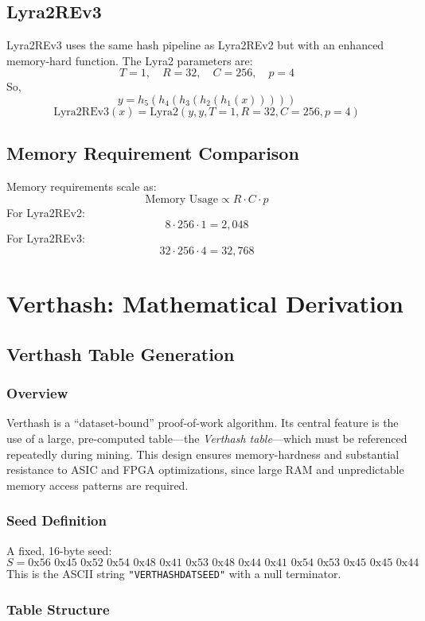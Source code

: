 \documentclass[12pt]{article}
\begin{document}
\subsection{Lyra2REv3}

Lyra2REv3 uses the same hash pipeline as Lyra2REv2 but with an enhanced memory-hard function. The Lyra2 parameters are:
\[
T=1, \quad R=32, \quad C=256, \quad p=4
\]
So,
\[
y = h_5(h_4(h_3(h_2(h_1(x)))))
\]
\[
\mathrm{Lyra2REv3}(x) = \mathrm{Lyra2}(y, y, T=1, R=32, C=256, p=4)
\]

\subsection{Memory Requirement Comparison}
Memory requirements scale as:
\[
\text{Memory Usage} \propto R \cdot C \cdot p
\]
For Lyra2REv2:
\[
8 \cdot 256 \cdot 1 = 2{,}048
\]
For Lyra2REv3:
\[
32 \cdot 256 \cdot 4 = 32{,}768
\]

\section{Verthash: Mathematical Derivation}

\subsection{Verthash Table Generation}

\subsubsection{Overview}

Verthash is a “dataset-bound” proof-of-work algorithm. Its central feature is the use of a large, pre-computed table—the \emph{Verthash table}—which must be referenced repeatedly during mining. This design ensures memory-hardness and substantial resistance to ASIC and FPGA optimizations, since large RAM and unpredictable memory access patterns are required.

\subsubsection{Seed Definition}

A fixed, 16-byte seed:
\[
S = \text{0x56 0x45 0x52 0x54 0x48 0x41 0x53 0x48 0x44 0x41 0x54 0x53 0x45 0x45 0x44 0x00}
\]
This is the ASCII string \texttt{"VERTHASHDATSEED"} with a null terminator.

\subsubsection{Table Structure}
\end{document}
